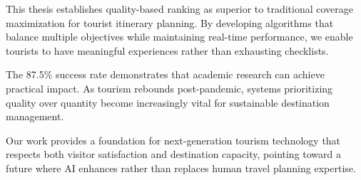 This thesis establishes quality-based ranking as superior to traditional coverage maximization for tourist itinerary planning. By developing algorithms that balance multiple objectives while maintaining real-time performance, we enable tourists to have meaningful experiences rather than exhausting checklists.

The 87.5\% success rate demonstrates that academic research can achieve practical impact. As tourism rebounds post-pandemic, systems prioritizing quality over quantity become increasingly vital for sustainable destination management.

Our work provides a foundation for next-generation tourism technology that respects both visitor satisfaction and destination capacity, pointing toward a future where AI enhances rather than replaces human travel planning expertise.